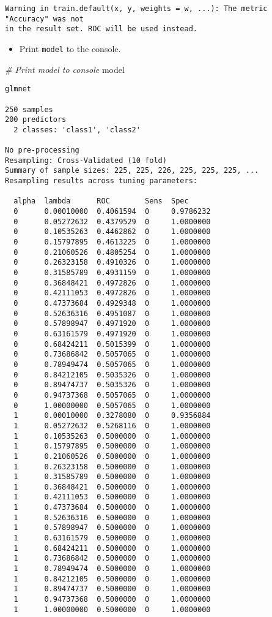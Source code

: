 \documentclass[]{book}
\newenvironment{Shaded}{\begin{snugshade}}{\end{snugshade}}
\newcommand{\CommentTok}[1]{\textcolor[rgb]{0.56,0.35,0.01}{\textit{#1}}}
\newcommand{\NormalTok}[1]{#1}
\providecommand{\tightlist}{%
  \setlength{\itemsep}{0pt}\setlength{\parskip}{0pt}}
\begin{document}
\begin{verbatim}
Warning in train.default(x, y, weights = w, ...): The metric "Accuracy" was not
in the result set. ROC will be used instead.
\end{verbatim}

\begin{itemize}
\tightlist
\item
  Print \texttt{model} to the console.
\end{itemize}

\begin{Shaded}
\begin{Highlighting}[]
\CommentTok{# Print model to console}
\NormalTok{model}
\end{Highlighting}
\end{Shaded}

\begin{verbatim}
glmnet 

250 samples
200 predictors
  2 classes: 'class1', 'class2' 

No pre-processing
Resampling: Cross-Validated (10 fold) 
Summary of sample sizes: 225, 225, 226, 225, 225, 225, ... 
Resampling results across tuning parameters:

  alpha  lambda      ROC        Sens  Spec     
  0      0.00010000  0.4061594  0     0.9786232
  0      0.05272632  0.4379529  0     1.0000000
  0      0.10535263  0.4462862  0     1.0000000
  0      0.15797895  0.4613225  0     1.0000000
  0      0.21060526  0.4805254  0     1.0000000
  0      0.26323158  0.4910326  0     1.0000000
  0      0.31585789  0.4931159  0     1.0000000
  0      0.36848421  0.4972826  0     1.0000000
  0      0.42111053  0.4972826  0     1.0000000
  0      0.47373684  0.4929348  0     1.0000000
  0      0.52636316  0.4951087  0     1.0000000
  0      0.57898947  0.4971920  0     1.0000000
  0      0.63161579  0.4971920  0     1.0000000
  0      0.68424211  0.5015399  0     1.0000000
  0      0.73686842  0.5057065  0     1.0000000
  0      0.78949474  0.5057065  0     1.0000000
  0      0.84212105  0.5035326  0     1.0000000
  0      0.89474737  0.5035326  0     1.0000000
  0      0.94737368  0.5057065  0     1.0000000
  0      1.00000000  0.5057065  0     1.0000000
  1      0.00010000  0.3278080  0     0.9356884
  1      0.05272632  0.5268116  0     1.0000000
  1      0.10535263  0.5000000  0     1.0000000
  1      0.15797895  0.5000000  0     1.0000000
  1      0.21060526  0.5000000  0     1.0000000
  1      0.26323158  0.5000000  0     1.0000000
  1      0.31585789  0.5000000  0     1.0000000
  1      0.36848421  0.5000000  0     1.0000000
  1      0.42111053  0.5000000  0     1.0000000
  1      0.47373684  0.5000000  0     1.0000000
  1      0.52636316  0.5000000  0     1.0000000
  1      0.57898947  0.5000000  0     1.0000000
  1      0.63161579  0.5000000  0     1.0000000
  1      0.68424211  0.5000000  0     1.0000000
  1      0.73686842  0.5000000  0     1.0000000
  1      0.78949474  0.5000000  0     1.0000000
  1      0.84212105  0.5000000  0     1.0000000
  1      0.89474737  0.5000000  0     1.0000000
  1      0.94737368  0.5000000  0     1.0000000
  1      1.00000000  0.5000000  0     1.0000000


\end{verbatim}
\end{document}
